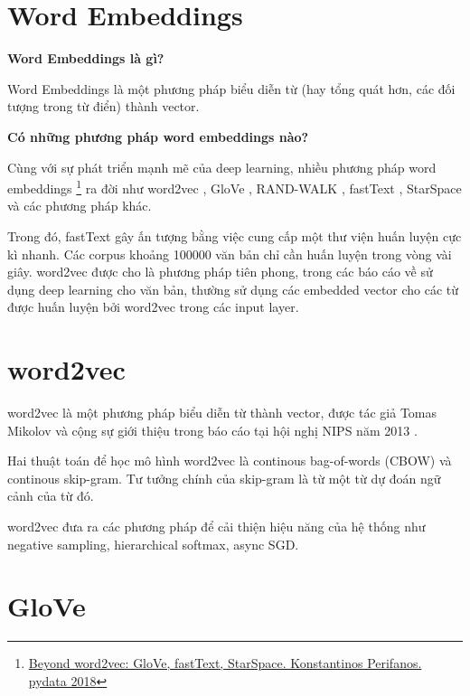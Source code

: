 

\section{Word Embeddings}

\textbf{Word Embeddings là gì?}

Word Embeddings là một phương pháp biểu diễn từ (hay tổng quát hơn, các đối tượng trong từ điển) thành vector.

\textbf{Có những phương pháp word embeddings nào?}

Cùng với sự phát triển mạnh mẽ của deep learning, nhiều phương pháp word embeddings \footnote{\href{https://pydata.org/london2018/schedule/presentation/29/}{Beyond word2vec: GloVe, fastText, StarSpace. Konstantinos Perifanos. pydata 2018}} ra đời như word2vec \cite{DBLP:conf/nips/MikolovSCCD13}, GloVe \cite{DBLP:conf/emnlp/PenningtonSM14}, RAND-WALK \cite{DBLP:journals/corr/AroraLLMR15}, fastText \cite{DBLP:conf/eacl/GraveMJB17}, StarSpace \cite{DBLP:conf/aaai/WuFCABW18} và các phương pháp khác.

Trong đó, fastText gây ấn tượng bằng việc cung cấp một thư viện huấn luyện cực kì nhanh. Các corpus khoảng 100000 văn bản chỉ cần huấn luyện trong vòng vài giây. word2vec được cho là phương pháp tiên phong, trong các báo cáo về sử dụng deep learning cho văn bản, thường sử dụng các embedded vector cho các từ được huấn luyện bởi word2vec trong các input layer.

\section{word2vec}

word2vec là một phương pháp biểu diễn từ thành vector, được tác giả Tomas Mikolov và cộng sự giới thiệu trong báo cáo tại hội nghị NIPS năm 2013 \cite{DBLP:conf/nips/MikolovSCCD13}.

Hai thuật toán để học mô hình word2vec là continous bag-of-words (CBOW) và continous skip-gram. Tư tưởng chính của skip-gram là từ một từ dự đoán ngữ cảnh của từ đó.

word2vec đưa ra các phương pháp để cải thiện hiệu năng của hệ thống như negative sampling, hierarchical softmax, async SGD.

\section{GloVe}

